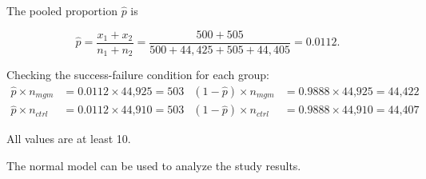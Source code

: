 \begin{example}
The pooled proportion $\hat{p}$ is  

\[\hat{p} = \dfrac{x_{1} + x_{2}}{n_{1} + n_{2}} = \dfrac{500 + 505}{500 + 44,425 + 505 + 44,405} = 0.0112. \]

Checking the success-failure condition for each group: 
\begin{align*}
\hat{p} \times n_{mgm} &= 0.0112 \times \text{44,925} = 503
& (1 - \hat{p}) \times n_{mgm} &= 0.9888 \times \text{44,925} = \text{44,422} \\
\hat{p} \times n_{ctrl} &= 0.0112 \times \text{44,910} = 503
& (1 - \hat{p}) \times n_{ctrl} &= 0.9888 \times \text{44,910} = \text{44,407}
\end{align*}

All values are at least 10. 

The normal model can be used to analyze the study results.
\label{mammogramSuccessFailure}
\end{example}

